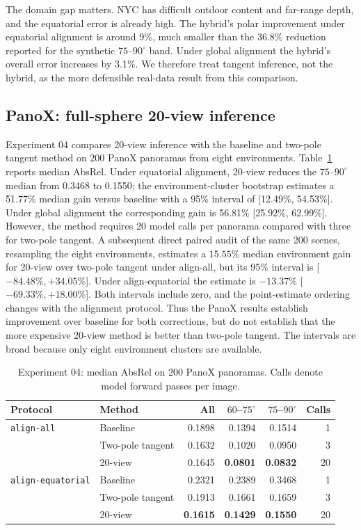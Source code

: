\documentclass{article}
\begin{document}
The domain gap matters. NYC has difficult outdoor content and far-range depth, and the equatorial error is already high. The hybrid's polar improvement under equatorial alignment is around 9\%, much smaller than the 36.8\% reduction reported for the synthetic $75$--$90^\circ$ band. Under global alignment the hybrid's overall error increases by 3.1\%. We therefore treat tangent inference, not the hybrid, as the more defensible real-data result from this comparison.

\subsection{PanoX: full-sphere 20-view inference}

Experiment 04 compares 20-view inference with the baseline and two-pole tangent method on 200 PanoX panoramas from eight environments. Table~\ref{tab:twenty-view} reports median AbsRel. Under equatorial alignment, 20-view reduces the $75$--$90^\circ$ median from 0.3468 to 0.1550; the environment-cluster bootstrap estimates a 51.77\% median gain versus baseline with a 95\% interval of [12.49\%, 54.53\%]. Under global alignment the corresponding gain is 56.81\% [25.92\%, 62.99\%]. However, the method requires 20 model calls per panorama compared with three for two-pole tangent. A subsequent direct paired audit of the same 200 scenes, resampling the eight environments, estimates a $15.55\%$ median environment gain for 20-view over two-pole tangent under align-all, but its 95\% interval is [$-84.48\%, +34.05\%$]. Under align-equatorial the estimate is $-13.37\%$ [$-69.33\%, +18.00\%$]. Both intervals include zero, and the point-estimate ordering changes with the alignment protocol. Thus the PanoX results establish improvement over baseline for both corrections, but do not establish that the more expensive 20-view method is better than two-pole tangent. The intervals are broad because only eight environment clusters are available.

\begin{table}[t]
\caption{Experiment 04: median AbsRel on 200 PanoX panoramas. Calls denote model forward passes per image.}
\label{tab:twenty-view}
\centering\small
\begin{tabular}{llrrrr}
\toprule
Protocol & Method & All & $60$--$75^\circ$ & $75$--$90^\circ$ & Calls\\
\midrule
\texttt{align-all} & Baseline & 0.1898 & 0.1394 & 0.1514 & 1\\
 & Two-pole tangent & 0.1632 & 0.1020 & 0.0950 & 3\\
 & 20-view & 0.1645 & \textbf{0.0801} & \textbf{0.0832} & 20\\
\midrule
\texttt{align-equatorial} & Baseline & 0.2321 & 0.2389 & 0.3468 & 1\\
 & Two-pole tangent & 0.1913 & 0.1661 & 0.1659 & 3\\
 & 20-view & \textbf{0.1615} & \textbf{0.1429} & \textbf{0.1550} & 20\\
\bottomrule
\end{tabular}
\end{table}
\end{document}
